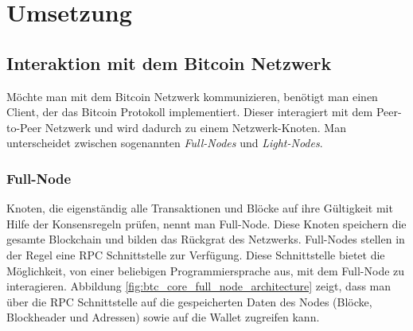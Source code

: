 \section{Umsetzung}

\subsection{Interaktion mit dem Bitcoin Netzwerk}

Möchte man mit dem Bitcoin Netzwerk kommunizieren, benötigt man einen Client, der das Bitcoin Protokoll implementiert. Dieser interagiert mit dem Peer-to-Peer Netzwerk und wird dadurch zu einem Netzwerk-Knoten. Man unterscheidet zwischen sogenannten \textit{Full-Nodes} und \textit{Light-Nodes}.
\subsubsection{Full-Node}
Knoten, die eigenständig alle Transaktionen und Blöcke auf ihre Gültigkeit mit Hilfe der Konsensregeln prüfen, nennt man Full-Node. Diese Knoten speichern die gesamte Blockchain und bilden das Rückgrat des Netzwerks.
Full-Nodes stellen in der Regel eine RPC Schnittstelle zur Verfügung. Diese Schnittstelle bietet die Möglichkeit, von einer beliebigen Programmiersprache aus, mit dem Full-Node zu interagieren.
Abbildung \ref{fig:btc_core_full_node_architecture} zeigt, dass man über die RPC Schnittstelle auf die gespeicherten Daten des Nodes (Blöcke, Blockheader und Adressen) sowie auf die Wallet zugreifen kann.

